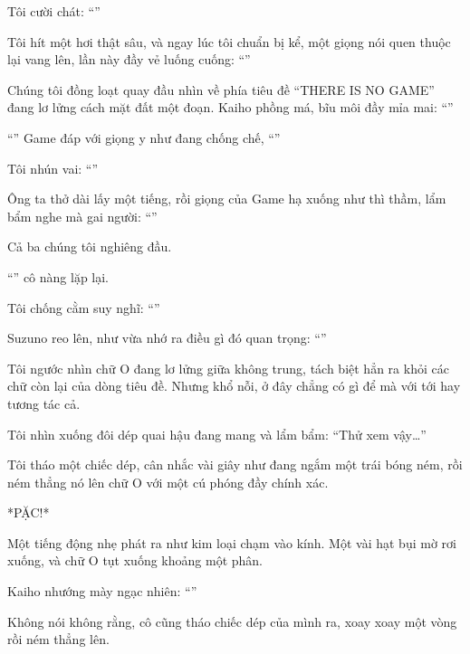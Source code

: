 \documentclass[../main.tex]{subfiles}
\begin{document}
Tôi cười chát: ``''

Tôi hít một hơi thật sâu, và ngay lúc tôi chuẩn bị kể, một giọng nói quen thuộc lại vang lên, lần này đầy vẻ luống cuống: ``''

Chúng tôi đồng loạt quay đầu nhìn về phía tiêu đề ``THERE IS NO GAME'' đang lơ lửng cách mặt đất một đoạn. Kaiho phồng má, bĩu môi đầy mỉa mai: ``''

``'' Game đáp với giọng y như đang chống chế, ``''

Tôi nhún vai: ``''

Ông ta thở dài lấy một tiếng, rồi giọng của Game hạ xuống như thì thầm, lẩm bẩm nghe mà gai người: ``''

Cả ba chúng tôi nghiêng đầu.

``'' cô nàng lặp lại.

Tôi chống cằm suy nghĩ: ``''

Suzuno reo lên, như vừa nhớ ra điều gì đó quan trọng: ``''

Tôi ngước nhìn chữ O đang lơ lửng giữa không trung, tách biệt hẳn ra khỏi các chữ còn lại của dòng tiêu đề. Nhưng khổ nỗi, ở đây chẳng có gì để mà với tới hay tương tác cả.

Tôi nhìn xuống đôi dép quai hậu đang mang và lẩm bẩm: ``Thử xem vậy\dots''

Tôi tháo một chiếc dép, cân nhắc vài giây như đang ngắm một trái bóng ném, rồi ném thẳng nó lên chữ O với một cú phóng đầy chính xác.

*PẶC!*

Một tiếng động nhẹ phát ra như kim loại chạm vào kính. Một vài hạt bụi mờ rơi xuống, và chữ O tụt xuống khoảng một phân.

Kaiho nhướng mày ngạc nhiên: ``''

Không nói không rằng, cô cũng tháo chiếc dép của mình ra, xoay xoay một vòng rồi ném thẳng lên.
\end{document}
